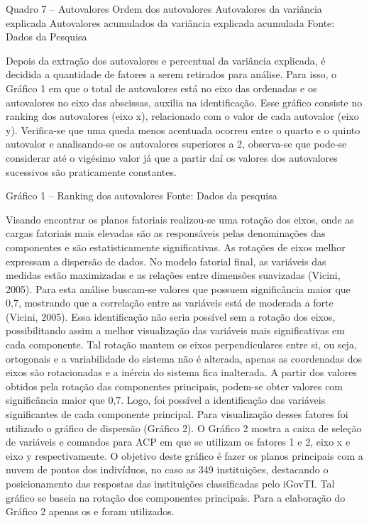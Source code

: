  Quadro 7 – Autovalores  Ordem dos autovalores  Autovalores da variância explicada Autovalores acumulados da variância explicada acumulada
Fonte: Dados da Pesquisa

Depois da extração dos autovalores e percentual da variância explicada, é decidida a quantidade de fatores a serem retirados para análise. Para isso, o Gráfico 1 em que o total de autovalores está no eixo das ordenadas e os autovalores  no eixo das abscissas, auxilia na identificação. Esse gráfico consiste no ranking dos autovalores (eixo x), relacionado com o valor de cada autovalor (eixo y). Verifica-se que uma queda menos acentuada ocorreu entre o quarto e o quinto autovalor e analisando-se os autovalores superiores a 2, observa-se que pode-se considerar até o vigésimo valor já que a partir daí os valores dos autovalores sucessivos são praticamente constantes.
 
Gráfico 1 – Ranking dos autovalores
Fonte: Dados da pesquisa

Visando encontrar os planos fatoriais realizou-se uma rotação dos eixos, onde as cargas fatoriais mais elevadas são as responsáveis pelas denominações das componentes e são estatisticamente significativas. As rotações de eixos melhor expressam a dispersão de dados. No modelo fatorial final, as variáveis das medidas estão maximizadas e as relações entre dimensões suavizadas (Vicini, 2005).
Para esta análise buscam-se valores que possuem significância maior que 0,7, mostrando que a correlação entre as variáveis está de moderada a forte (Vicini, 2005). Essa identificação não seria possível sem a rotação dos eixos, possibilitando assim a melhor visualização das variáveis mais significativas em cada componente. Tal rotação mantem os eixos perpendiculares entre si, ou seja, ortogonais e a variabilidade do sistema não é alterada, apenas as coordenadas dos eixos são rotacionadas e a inércia do sistema fica inalterada. 
A partir dos valores obtidos pela rotação das componentes principais, podem-se obter valores com significância maior que 0,7. Logo, foi possível a identificação das variáveis significantes de cada componente principal.
Para visualização desses fatores foi utilizado o gráfico de dispersão (Gráfico 2). O Gráfico 2 mostra a caixa de seleção de variáveis e comandos para ACP em que se utilizam os fatores 1 e 2, eixo x e eixo y respectivamente. O objetivo deste gráfico é fazer os planos principais com a nuvem de pontos dos indivíduos, no caso as 349 instituições, destacando o posicionamento das respostas das instituições classificadas pelo iGovTI. Tal gráfico se baseia na rotação dos componentes principais. Para a elaboração do Gráfico 2 apenas os  e  foram utilizados.
 
